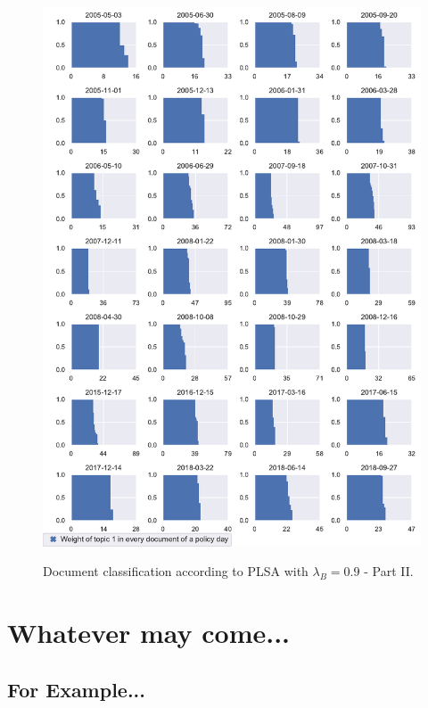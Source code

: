\documentclass[11pt,a4paper,english,oneside]{book}
\numberwithin{equation}{chapter}
\begin{document}
\begin{figure}
	\caption{Document classification according to PLSA with $\lambda_B = 0.9$ - Part II.}
	\centering
	\includegraphics[scale=0.8]{Images/docsplit02_bgLamb_0_9.pdf}
	\label{classdoc02L09}
\end{figure}

\renewcommand{\theequation}{C.\arabic{equation}}


\chapter{Whatever may come...}



\section{For Example... }
\end{document}
